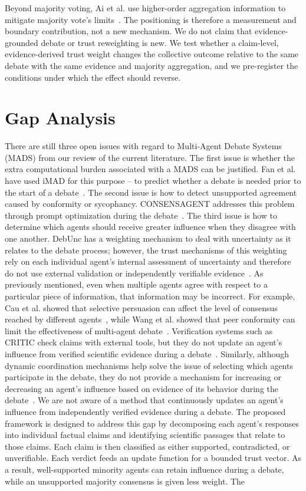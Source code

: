 Beyond majority voting, Ai et al. use higher-order aggregation information to mitigate majority vote's limits~\cite{ai2026beyond}. The positioning is therefore a measurement and boundary contribution, not a new mechanism. We do not claim that evidence-grounded debate or trust reweighting is new. We test whether a claim-level, evidence-derived trust weight changes the collective outcome relative to the same debate with the same evidence and majority aggregation, and we pre-register the conditions under which the effect should reverse.

\section{Gap Analysis}
\label{sec:gap-analysis}
There are still three open issues with regard to Multi-Agent Debate Systems (MADS) from our review of the current literature. The first issue is whether the extra computational burden associated with a MADS can be justified. Fan et al. have used iMAD for this purpose -- to predict whether a debate is needed prior to the start of a debate~\cite{fan2026imad}. The second issue is how to detect unsupported agreement caused by conformity or sycophancy. CONSENSAGENT addresses this problem through prompt optimization during the debate~\cite{pitre-etal-2025-consensagent}. The third issue is how to determine which agents should receive greater influence when they disagree with one another. DebUnc has a weighting mechanism to deal with uncertainty as it relates to the debate process; however, the trust mechanisms of this weighting rely on each individual agent's internal assessment of uncertainty and therefore do not use external validation or independently verifiable evidence~\cite{yoffe-etal-2025-debunc}. As previously mentioned, even when multiple agents agree with respect to a particular piece of information, that information may be incorrect. For example, Cau et al. showed that selective persuasion can affect the level of consensus reached by different agents~\cite{cau2025selective}, while Wang et al. showed that peer conformity can limit the effectiveness of multi-agent debate~\cite{wang-etal-2024-rethinking-bounds}. Verification systems such as CRITIC check claims with external tools, but they do not update an agent's influence from verified scientific evidence during a debate~\cite{gou2024critic}. Similarly, although dynamic coordination mechanisms help solve the issue of selecting which agents participate in the debate, they do not provide a mechanism for increasing or decreasing an agent's influence based on evidence of its behavior during the debate~\cite{zhou2025reso}. We are not aware of a method that continuously updates an agent's influence from independently verified evidence during a debate. The proposed framework is designed to address this gap by decomposing each agent's responses into individual factual claims and identifying scientific passages that relate to those claims. Each claim is then classified as either supported, contradicted, or unverifiable. Each verdict feeds an update function for a bounded trust vector. As a result, well-supported minority agents can retain influence during a debate, while an unsupported majority consensus is given less weight. The 